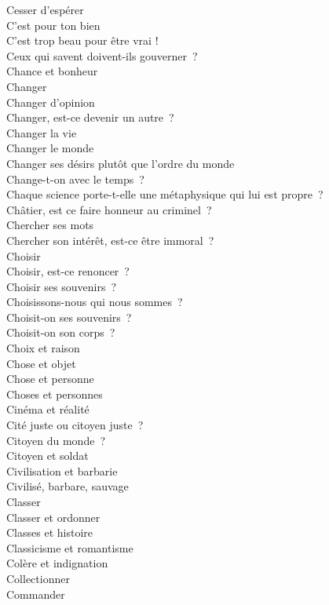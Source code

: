 \documentclass[a4paper,12pt]{article}
\begin{document}
Cesser d'espérer \\
C'est pour ton bien \\
C'est trop beau pour être vrai ! \\
Ceux qui savent doivent-ils gouverner ? \\
Chance et bonheur \\
Changer \\
Changer d'opinion \\
Changer, est-ce devenir un autre ? \\
Changer la vie \\
Changer le monde \\
Changer ses désirs plutôt que l'ordre du monde \\
Change-t-on avec le temps ? \\
Chaque science porte-t-elle une métaphysique qui lui est propre ? \\
Châtier, est ce faire honneur au criminel ? \\
Chercher ses mots \\
Chercher son intérêt, est-ce être immoral ? \\
Choisir \\
Choisir, est-ce renoncer ? \\
Choisir ses souvenirs ? \\
Choisissons-nous qui nous sommes ? \\
Choisit-on ses souvenirs ? \\
Choisit-on son corps ? \\
Choix et raison \\
Chose et objet \\
Chose et personne \\
Choses et personnes \\
Cinéma et réalité \\
Cité juste ou citoyen juste ? \\
Citoyen du monde ? \\
Citoyen et soldat \\
Civilisation et barbarie \\
Civilisé, barbare, sauvage \\
Classer \\
Classer et ordonner \\
Classes et histoire \\
Classicisme et romantisme \\
Colère et indignation \\
Collectionner \\
Commander \\
\end{document}
